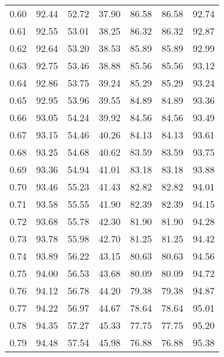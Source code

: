 \begin{tabular}{|c|c|c|c|c|c|c|}
      0.60 &     92.44 &     52.72 &      37.90 &   86.58 &      86.58 &         92.74 \\
      0.61 &     92.55 &     53.01 &      38.25 &   86.32 &      86.32 &         92.87 \\
      0.62 &     92.64 &     53.20 &      38.53 &   85.89 &      85.89 &         92.99 \\
      0.63 &     92.75 &     53.46 &      38.88 &   85.56 &      85.56 &         93.12 \\
      0.64 &     92.86 &     53.75 &      39.24 &   85.29 &      85.29 &         93.24 \\
      0.65 &     92.95 &     53.96 &      39.55 &   84.89 &      84.89 &         93.36 \\
      0.66 &     93.05 &     54.24 &      39.92 &   84.56 &      84.56 &         93.49 \\
      0.67 &     93.15 &     54.46 &      40.26 &   84.13 &      84.13 &         93.61 \\
      0.68 &     93.25 &     54.68 &      40.62 &   83.59 &      83.59 &         93.75 \\
      0.69 &     93.36 &     54.94 &      41.01 &   83.18 &      83.18 &         93.88 \\
      0.70 &     93.46 &     55.23 &      41.43 &   82.82 &      82.82 &         94.01 \\
      0.71 &     93.58 &     55.55 &      41.90 &   82.39 &      82.39 &         94.15 \\
      0.72 &     93.68 &     55.78 &      42.30 &   81.90 &      81.90 &         94.28 \\
      0.73 &     93.78 &     55.98 &      42.70 &   81.25 &      81.25 &         94.42 \\
      0.74 &     93.89 &     56.22 &      43.15 &   80.63 &      80.63 &         94.56 \\
      0.75 &     94.00 &     56.53 &      43.68 &   80.09 &      80.09 &         94.72 \\
      0.76 &     94.12 &     56.78 &      44.20 &   79.38 &      79.38 &         94.87 \\
      0.77 &     94.22 &     56.97 &      44.67 &   78.64 &      78.64 &         95.01 \\
      0.78 &     94.35 &     57.27 &      45.33 &   77.75 &      77.75 &         95.20 \\
      0.79 &     94.48 &     57.54 &      45.98 &   76.88 &      76.88 &         95.38 \\

\end{tabular}
